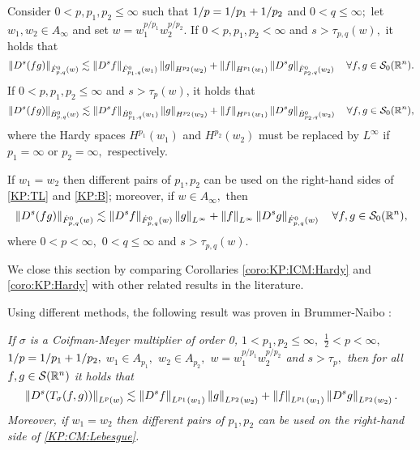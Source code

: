 \begin{corollary}\label{coro:KP:TL:B}  Consider  $0 < p, p_1, p_2  \le \infty$  such that $\hcline$ and  $0 < q \leq \infty;$ let  $w_1,w_2\in A_\infty$ and set $w=w_1^{{p}/{p_1}} w_2^{{p}/{p_2}}.$ 
If $0 < p ,p_1,p_2< \infty$ and  $s > \tau_{p,q}(w),$ it holds that
\begin{equation}\label{KP:TL}
\norm{D^s (fg)}{\tlw{p}{0}{q}{w}} \lesssim \norm{D^s f}{\tlw{p_1}{0}{q}{w_1}} \norm{g}{H^{p_2}(w_2)} +  \norm{f}{H^{p_1}(w_1)}   \norm{D^s g}{\tlw{p_2}{0}{q}{w_2}} \quad \forall f, g \in \swz.
\end{equation}
If $0 < p, p_1,p_2 \le \infty$ and $s > \tau_p(w)$, it holds that
\begin{equation}\label{KP:B}
\norm{D^s(fg)}{\besw{p}{0}{q}{w}} \lesssim \norm{D^s f}{\besw{p_1}{0}{q}{w_1}} \norm{g}{H^{p_2}(w_2)} +  \norm{f}{H^{p_1}(w_1)}   \norm{D^s g}{\besw{p_2}{0}{q}{w_2}} \quad \forall f, g \in \swz,
\end{equation}
where the Hardy spaces $H^{p_1}(w_1)$ and $H^{p_2}(w_2)$ must be replaced by $L^\infty$ if $p_1=\infty$ or $p_2=\infty,$ respectively.

If $w_1=w_2$ then different pairs of $p_1, p_2$ can be used on the right-hand sides of \eqref{KP:TL} and \eqref{KP:B}; moreover, if $w\in A_\infty,$ then 
\begin{equation}\label{KP:TL2}
\norm{D^s(fg)}{\tlw{p}{0}{q}{w}} \lesssim \norm{D^s f}{\tlw{p}{0}{q}{w}} \norm{g}{L^\infty} +  \norm{f}{L^\infty}   \norm{D^s g}{\tlw{p}{0}{q}{w}} \quad \forall f, g \in \swz,
\end{equation}
where $0<p<\infty,$ $0<q\le \infty$ and $s>\tau_{p,q}(w).$
\end{corollary}

We close this section by comparing Corollaries \ref{coro:KP:ICM:Hardy} and \ref{coro:KP:Hardy} with other related results in the literature. 

 Using different methods, the following result was proven in Brummer-Naibo \cite[Theorem 1.1]{BrNa2017}:

\textit{If $\sigma$ is a Coifman-Meyer multiplier of order 0, $1<p_1,p_2\le \infty,$ $\frac{1}{2}<p<\infty,$ $\hcline,$  $w_1\in A_{p_1},$ $w_2\in A_{p_2},$ $w=w_1^{{p}/{p_1}} w_2^{{p}/{p_2}}$ and $s>\tau_{p},$ then for all $f,g\in \sw$ it holds that
\begin{equation}\label{KP:CM:Lebesgue}
\norm{D^s(T_\sigma(f,g))}{L^p(w)} \lesssim \norm{D^s f}{L^{p_1}(w_1)} \norm{g}{L^{p_2}(w_2)} +  \norm{f}{L^{p_1}(w_1)}   \norm{D^s g}{L^{p_2}(w_2)}. 
\end{equation}
Moreover, if $w_1=w_2$ then different pairs of $p_1, p_2$ can be used on the right-hand side of \eqref{KP:CM:Lebesgue}.
}

